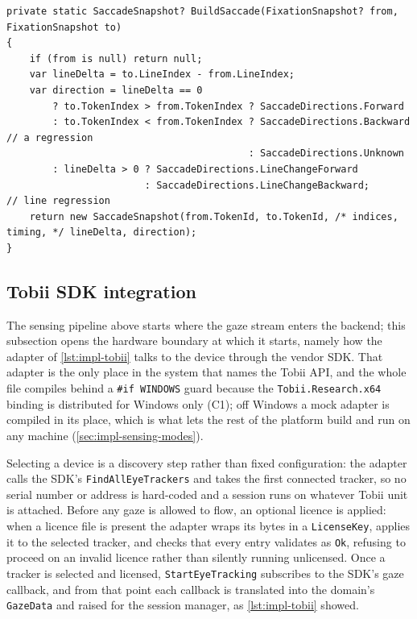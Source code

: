 \begin{listing}[htbp]
\begin{verbatim}
private static SaccadeSnapshot? BuildSaccade(FixationSnapshot? from, FixationSnapshot to)
{
    if (from is null) return null;
    var lineDelta = to.LineIndex - from.LineIndex;
    var direction = lineDelta == 0
        ? to.TokenIndex > from.TokenIndex ? SaccadeDirections.Forward
        : to.TokenIndex < from.TokenIndex ? SaccadeDirections.Backward          // a regression
                                          : SaccadeDirections.Unknown
        : lineDelta > 0 ? SaccadeDirections.LineChangeForward
                        : SaccadeDirections.LineChangeBackward;                   // line regression
    return new SaccadeSnapshot(from.TokenId, to.TokenId, /* indices, timing, */ lineDelta, direction);
}
\end{verbatim}
\caption{Saccade and regression classification (abbreviated from \texttt{BuiltIn\-EyeMovement\-AnalysisStrategy.cs}). A saccade spans two confirmed fixations; a backward move within or across lines is classified as a regression and increments the running count.}
\label{lst:impl-saccade}
\end{listing}

\FloatBarrier
\subsection{Tobii SDK integration}
\label{subsec:impl-tobii-sdk}

The sensing pipeline above starts where the gaze stream enters the backend; this subsection opens the hardware boundary at which it starts, namely how the adapter of \cref{lst:impl-tobii} talks to the device through the vendor SDK.
That adapter is the only place in the system that names the Tobii API, and the whole file compiles behind a \texttt{\#if WINDOWS} guard because the \texttt{Tobii.Research.x64} binding is distributed for Windows only (C1); off Windows a mock adapter is compiled in its place, which is what lets the rest of the platform build and run on any machine (\cref{sec:impl-sensing-modes}).

Selecting a device is a discovery step rather than fixed configuration: the adapter calls the SDK's \texttt{FindAllEyeTrackers} and takes the first connected tracker, so no serial number or address is hard-coded and a session runs on whatever Tobii unit is attached.
Before any gaze is allowed to flow, an optional licence is applied: when a licence file is present the adapter wraps its bytes in a \texttt{LicenseKey}, applies it to the selected tracker, and checks that every entry validates as \texttt{Ok}, refusing to proceed on an invalid licence rather than silently running unlicensed.
Once a tracker is selected and licensed, \texttt{StartEyeTracking} subscribes to the SDK's gaze callback, and from that point each callback is translated into the domain's \texttt{GazeData} and raised for the session manager, as \cref{lst:impl-tobii} showed.

